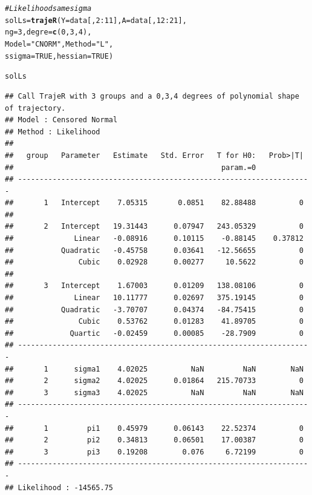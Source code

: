 \documentclass{article}\usepackage[]{graphicx}\usepackage[]{color}
\makeatletter
\newcommand{\hlnum}[1]{\textcolor[rgb]{0.686,0.059,0.569}{#1}}%
\newcommand{\hlstr}[1]{\textcolor[rgb]{0.192,0.494,0.8}{#1}}%
\newcommand{\hlcom}[1]{\textcolor[rgb]{0.678,0.584,0.686}{\textit{#1}}}%
\newcommand{\hlopt}[1]{\textcolor[rgb]{0,0,0}{#1}}%
\newcommand{\hlstd}[1]{\textcolor[rgb]{0.345,0.345,0.345}{#1}}%
\newcommand{\hlkwb}[1]{\textcolor[rgb]{0.69,0.353,0.396}{#1}}%
\newcommand{\hlkwc}[1]{\textcolor[rgb]{0.333,0.667,0.333}{#1}}%
\newcommand{\hlkwd}[1]{\textcolor[rgb]{0.737,0.353,0.396}{\textbf{#1}}}%
\newenvironment{kframe}{%
 \def\at@end@of@kframe{}%
 \ifinner\ifhmode%
  \def\at@end@of@kframe{\end{minipage}}%
  \begin{minipage}{\columnwidth}%
 \fi\fi%
 \def\FrameCommand##1{\hskip\@totalleftmargin \hskip-\fboxsep
 \colorbox{shadecolor}{##1}\hskip-\fboxsep
     \hskip-\linewidth \hskip-\@totalleftmargin \hskip\columnwidth}%
 \MakeFramed {\advance\hsize-\width
   \@totalleftmargin\z@ \linewidth\hsize
   \@setminipage}}%
 {\par\unskip\endMakeFramed%
 \at@end@of@kframe}
\newenvironment{knitrout}{}{} %
\makeatother
\begin{document}
\begin{knitrout}
\color{fgcolor}\begin{kframe}
\begin{alltt}
\hlcom{# Likelihood same sigma}
\hlstd{solLs} \hlkwb{=} \hlkwd{trajeR}\hlstd{(}\hlkwc{Y} \hlstd{= data[,}\hlnum{2}\hlopt{:}\hlnum{11}\hlstd{],} \hlkwc{A} \hlstd{= data[,}\hlnum{12}\hlopt{:}\hlnum{21}\hlstd{],}
               \hlkwc{ng} \hlstd{=} \hlnum{3}\hlstd{,} \hlkwc{degre} \hlstd{=} \hlkwd{c}\hlstd{(}\hlnum{0}\hlstd{,}\hlnum{3}\hlstd{,}\hlnum{4}\hlstd{),}
               \hlkwc{Model} \hlstd{=} \hlstr{"CNORM"}\hlstd{,} \hlkwc{Method} \hlstd{=} \hlstr{"L"}\hlstd{,}
               \hlkwc{ssigma} \hlstd{=} \hlnum{TRUE}\hlstd{,} \hlkwc{hessian} \hlstd{=} \hlnum{TRUE}\hlstd{)}
\end{alltt}
\end{kframe}
\end{knitrout}
\begin{knitrout}
\color{fgcolor}\begin{kframe}
\begin{alltt}
\hlstd{solLs}
\end{alltt}
\begin{verbatim}
## Call TrajeR with 3 groups and a 0,3,4 degrees of polynomial shape of trajectory.
## Model : Censored Normal
## Method : Likelihood 
##  
##   group   Parameter   Estimate   Std. Error   T for H0:   Prob>|T|  
##                                                param.=0             
## --------------------------------------------------------------------
##       1   Intercept    7.05315       0.0851    82.88488          0  
##                                                                     
##       2   Intercept   19.31443      0.07947   243.05329          0  
##              Linear   -0.08916      0.10115    -0.88145    0.37812  
##           Quadratic   -0.45758      0.03641   -12.56655          0  
##               Cubic    0.02928      0.00277     10.5622          0  
##                                                                     
##       3   Intercept    1.67003      0.01209   138.08106          0  
##              Linear   10.11777      0.02697   375.19145          0  
##           Quadratic   -3.70707      0.04374   -84.75415          0  
##               Cubic    0.53762      0.01283    41.89705          0  
##             Quartic   -0.02459      0.00085    -28.7909          0  
## --------------------------------------------------------------------
##       1      sigma1    4.02025          NaN         NaN        NaN  
##       2      sigma2    4.02025      0.01864   215.70733          0  
##       3      sigma3    4.02025          NaN         NaN        NaN  
## --------------------------------------------------------------------
##       1         pi1    0.45979      0.06143    22.52374          0  
##       2         pi2    0.34813      0.06501    17.00387          0  
##       3         pi3    0.19208        0.076     6.72199          0  
## --------------------------------------------------------------------
## Likelihood : -14565.75
\end{verbatim}
\end{kframe}
\end{knitrout}
\end{document}
